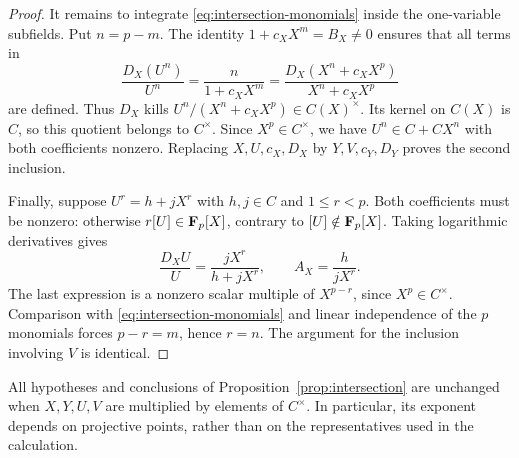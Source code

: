 \begin{proof}
It remains to integrate \eqref{eq:intersection-monomials} inside the
one-variable subfields.  Put $n=p-m$.  The identity
$1+c_XX^m=B_X\ne0$ ensures that all terms in
\[
 \frac{D_X(U^n)}{U^n}
 =\frac{n}{1+c_XX^m}
 =\frac{D_X(X^n+c_XX^p)}{X^n+c_XX^p}
\]
are defined.  Thus $D_X$ kills
$U^n/(X^n+c_XX^p)\in C(X)^\times$.  Its kernel on $C(X)$ is $C$,
so this quotient belongs to $C^\times$.  Since $X^p\in C^\times$,
we have $U^n\in C+CX^n$ with both coefficients nonzero.  Replacing
$X,U,c_X,D_X$ by $Y,V,c_Y,D_Y$ proves the second inclusion.

Finally, suppose $U^r=h+jX^r$ with $h,j\in C$ and $1\le r<p$.
Both coefficients must be nonzero: otherwise
$r[U]\in\mathbf F_p[X]$, contrary to $[U]\notin\mathbf F_p[X]$.
Taking logarithmic derivatives gives
\[
 \frac{D_XU}{U}=\frac{jX^r}{h+jX^r},
 \qquad A_X=\frac{h}{jX^r}.
\]
The last expression is a nonzero scalar multiple of $X^{p-r}$,
since $X^p\in C^\times$.  Comparison with
\eqref{eq:intersection-monomials} and linear independence of the
$p$ monomials forces $p-r=m$, hence $r=n$.
The argument for the inclusion involving $V$ is identical.
\end{proof}

All hypotheses and conclusions of Proposition~\ref{prop:intersection}
are unchanged when $X,Y,U,V$ are multiplied by elements of $C^\times$.
In particular, its exponent depends on projective points, rather than
on the representatives used in the calculation.
